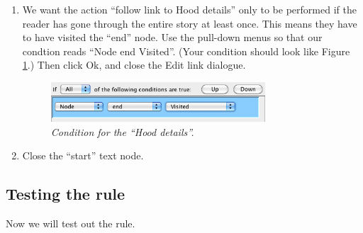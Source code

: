 \documentclass{article}
\begin{document}
\begin{enumerate}
\item We want the action ``follow link to Hood details'' only to be performed if
the reader has gone through the entire story at least once. This means they have
to have visited the ``end'' node. Use the pull-down menus so that our condtion
reads ``Node end Visited''. (Your condition should look like Figure
\ref{fig:condition_hood_details}.) Then click Ok, and close the Edit link
dialogue.

\begin{figure}[ht]
  \centering
  \includegraphics[width=8cm]{images/hypedyn-tutorial-1-figure-14}
  \caption{\textit{Condition for the ``Hood details''.}}
  \label{fig:condition_hood_details}
\end{figure} 

\item Close the ``start'' text node.
\end{enumerate}

\subsection{Testing the rule}

Now we will test out the rule.
\end{document}
